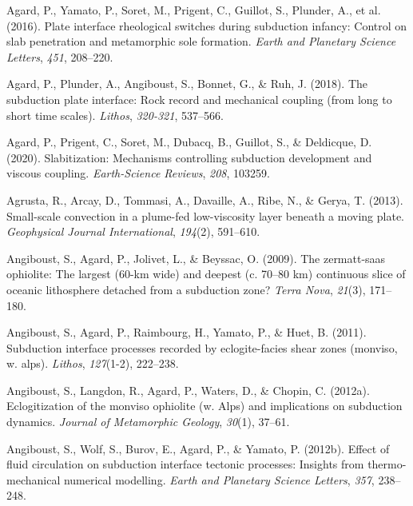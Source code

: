 \begin{CSLReferences}{1}{1}
\leavevmode{}%
Agard, P., Yamato, P., Soret, M., Prigent, C., Guillot, S., Plunder, A., et al. (2016). Plate interface rheological switches during subduction infancy: Control on slab penetration and metamorphic sole formation. \emph{Earth and Planetary Science Letters}, \emph{451}, 208--220.

\leavevmode{}%
Agard, P., Plunder, A., Angiboust, S., Bonnet, G., \& Ruh, J. (2018). The subduction plate interface: Rock record and mechanical coupling (from long to short time scales). \emph{Lithos}, \emph{320-321}, 537--566.

\leavevmode{}%
Agard, P., Prigent, C., Soret, M., Dubacq, B., Guillot, S., \& Deldicque, D. (2020). Slabitization: Mechanisms controlling subduction development and viscous coupling. \emph{Earth-Science Reviews}, \emph{208}, 103259.

\leavevmode{}%
Agrusta, R., Arcay, D., Tommasi, A., Davaille, A., Ribe, N., \& Gerya, T. (2013). Small-scale convection in a plume-fed low-viscosity layer beneath a moving plate. \emph{Geophysical Journal International}, \emph{194}(2), 591--610.

\leavevmode{}%
Angiboust, S., Agard, P., Jolivet, L., \& Beyssac, O. (2009). The zermatt-saas ophiolite: The largest (60-km wide) and deepest (c. 70--80 km) continuous slice of oceanic lithosphere detached from a subduction zone? \emph{Terra Nova}, \emph{21}(3), 171--180.

\leavevmode{}%
Angiboust, S., Agard, P., Raimbourg, H., Yamato, P., \& Huet, B. (2011). Subduction interface processes recorded by eclogite-facies shear zones (monviso, w. alps). \emph{Lithos}, \emph{127}(1-2), 222--238.

\leavevmode{}%
Angiboust, S., Langdon, R., Agard, P., Waters, D., \& Chopin, C. (2012a). Eclogitization of the monviso ophiolite (w. Alps) and implications on subduction dynamics. \emph{Journal of Metamorphic Geology}, \emph{30}(1), 37--61.

\leavevmode{}%
Angiboust, S., Wolf, S., Burov, E., Agard, P., \& Yamato, P. (2012b). Effect of fluid circulation on subduction interface tectonic processes: Insights from thermo-mechanical numerical modelling. \emph{Earth and Planetary Science Letters}, \emph{357}, 238--248.


\end{CSLReferences}
